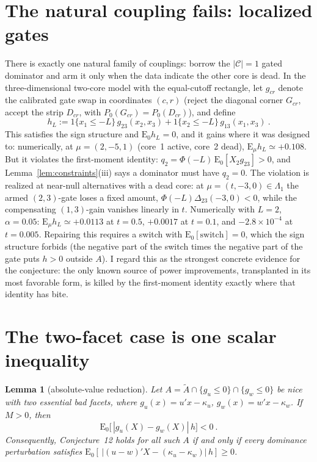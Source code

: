 \documentclass[12pt]{article}
\newtheorem{lemc}{Lemma}[section]
\theoremstyle{remark}
\newcommand{\E}{\mathrm E}
\newcommand{\cC}{\mathcal C}
\newcommand{\wt}{\widetilde}
\begin{document}
\section{The natural coupling fails: localized gates}

There is exactly one natural family of couplings: borrow the $|\cC|=1$
gated dominator and arm it only when the data indicate the other core is
dead. In the three-dimensional two-core model with the equal-cutoff
rectangle, let $g_{cr}$ denote the calibrated gate swap in coordinates
$(c,r)$ (reject the diagonal corner $G_{cr}$, accept the strip $D_{cr}$,
with $P_0(G_{cr})=P_0(D_{cr})$), and define
\[
h_L
:=
1\{x_1\le-L\}\,g_{23}(x_2,x_3)
+
1\{x_2\le-L\}\,g_{13}(x_1,x_3)~.
\]
This satisfies the sign structure and $\E_0h_L=0$, and it gains where it was
designed to: numerically, at $\mu=(2,-5,1)$ (core~1 active, core~2 dead),
$\E_\mu h_L\simeq+0.108$. But it violates the first-moment identity:
$q_2=\Phi(-L)\,\E_0[X_2g_{23}]>0$, and Lemma~\ref{lem:constraints}(iii)
says a dominator must have $q_2=0$. The violation is realized at near-null
alternatives with a dead core: at $\mu=(t,-3,0)\in\Lambda_1$ the armed
$(2,3)$-gate loses a fixed amount, $\Phi(-L)\Delta_{23}(-3,0)<0$, while the
compensating $(1,3)$-gain vanishes linearly in $t$. Numerically with
$L=2$, $\alpha=0.05$: $\E_\mu h_L\simeq+0.0113$ at $t=0.5$, $+0.0017$ at
$t=0.1$, and $-2.8\times10^{-4}$ at $t=0.005$. Repairing this requires a
switch with $\E_0[\text{switch}]=0$, which the sign structure forbids (the
negative part of the switch times the negative part of the gate puts
$h>0$ outside $A$). I regard this as the strongest concrete evidence for
the conjecture: the only known source of power improvements, transplanted
in its most favorable form, is killed by the first-moment identity exactly
where that identity has bite.

\section{The two-facet case is one scalar inequality}

\begin{lemc}[absolute-value reduction]\label{lem:absred}
Let $A=\wt A\cap\{g_u\le0\}\cap\{g_w\le0\}$ be nice with two essential bad
facets, where $g_u(x)=u'x-\kappa_u$, $g_w(x)=w'x-\kappa_w$. If $M>0$, then
\[
\E_0\bigl[\,|g_u(X)-g_w(X)|\,h\bigr]<0~.
\]
Consequently, Conjecture~12 holds for all such $A$ if and only if every
dominance perturbation satisfies
$\E_0[\,|(u-w)'X-(\kappa_u-\kappa_w)|\,h]\ge0$.
\end{lemc}
\end{document}
